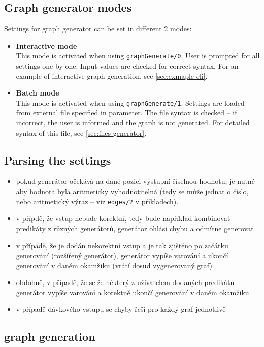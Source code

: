 \documentclass[11pt, a4paper,draft]{article}
\newcommand{\pl}[1]{\texttt{#1}} %
\theoremstyle{plain}
\theoremstyle{definition}
\theoremstyle{remark}
\begin{document}
\subsection{Graph generator modes}
\label{sec:generator-modes}
Settings for graph generator can be set in different 2 modes:
\begin{itemize}
\item \textbf{Interactive mode} \\
This mode is activated when using \pl{graphGenerate/0}. 
User is prompted for all settings one-by-one. Input values are checked for correct syntax. 
For an example of interactive graph generation, see \autoref{sec:exmaple-cli}.
\item \textbf{Batch mode} \\
This mode is activated when using \pl{graphGenerate/1}. 
Settings are loaded from external file specified in parameter. 
The file syntax is checked -- if incorrect, the user is informed and the graph is not generated. 
For detailed syntax of this file, see \autoref{sec:files-generator}.
\end{itemize}

\subsection{Parsing the settings}
\label{sec:generator-parsing}
\begin{itemize}
    \item pokud generátor očekává na dané pozici výstupní číselnou hodnotu, je nutné
    aby hodnota byla aritmeticky vyhodnotitelná (tedy se může jednat o číslo,
    nebo aritmetický výraz -- viz \pl{edges/2} v příkladech).
    \item v přípdě, že vstup nebude korektní, tedy bude například kombinovat predikáty
    z různých generátorů, generátor ohlásí chybu a odmítne generovat
    \item v případě, že je dodán nekorektní vstup a je tak zjištěno po začátku generování
    (rozšířený generátor), generátor vypíše varování a ukončí generování v daném
    okamžiku (vrátí dosud vygenerovaný graf).
    \item obdobně, v případě, že selže některý z uživatelem dodaných predikátů generátor
    vypíše varování a korektně ukončí generování v daném okamžiku
    \item v případě dávkového vstupu se chyby řeší pro každý graf jednotlivě
\end{itemize}

\subsection{graph generation}
\label{sec:generator-generation}
\end{document}
